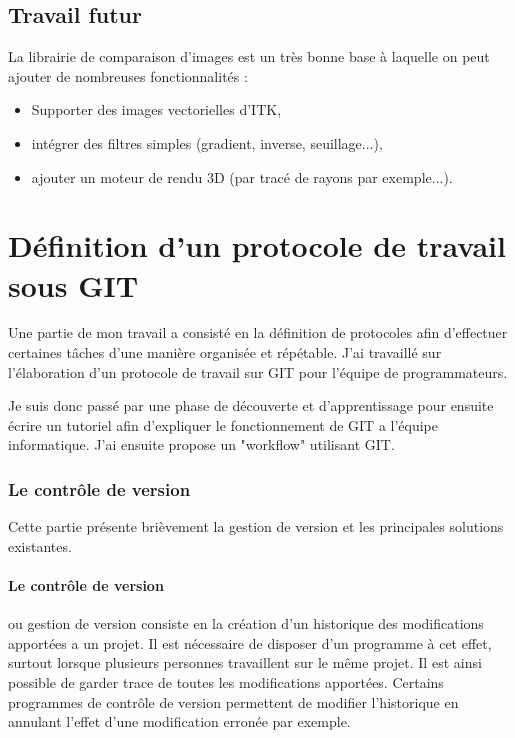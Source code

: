 \subsection{Travail futur}
La librairie de comparaison d'images est un très bonne base à laquelle on peut ajouter de nombreuses fonctionnalités :
\begin{itemize}
  \item Supporter des images vectorielles d'ITK,
  \item intégrer des filtres simples (gradient, inverse, seuillage...),
  \item ajouter un moteur de rendu 3D (par tracé de rayons par exemple...).
\end{itemize}








\section{Définition d'un protocole de travail sous GIT}

Une partie de mon travail a consisté en la définition de protocoles 
afin d'effectuer certaines tâches d'une manière organisée et répétable. 
J'ai travaillé sur l'élaboration d'un protocole de travail sur GIT pour l'équipe de programmateurs.

Je suis donc passé par une phase de découverte et d'apprentissage pour ensuite écrire un tutoriel 
afin d'expliquer le fonctionnement de GIT a l'équipe informatique. 
J'ai ensuite propose un "workflow" utilisant GIT.

\subsubsection{Le contrôle de version}

Cette partie présente brièvement la gestion de version et les principales solutions existantes.

\paragraph{Le contrôle de version} ou gestion de version consiste en
la création d'un historique des modifications apportées a un projet.
Il est nécessaire de disposer d'un programme à cet effet, surtout lorsque plusieurs personnes travaillent sur le même projet.
Il est ainsi possible de garder trace de toutes les modifications apportées.
Certains programmes de contrôle de version permettent de modifier l'historique en annulant l'effet d'une modification erronée par exemple.

